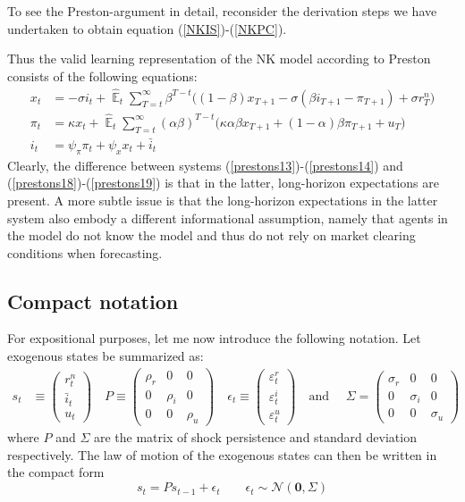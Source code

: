 \documentclass[11pt]{article}
\renewcommand{\[}{\begin{equation}}
\renewcommand{\]}{\end{equation}}
\DeclareMathOperator{\E}{\mathbb{E}}
\begin{document}
To see the Preston-argument in detail, reconsider the derivation steps we have undertaken to obtain equation (\ref{NKIS})-(\ref{NKPC}).

Thus the valid learning representation of the NK model according to Preston consists of the following equations:
\begin{align}
x_t &=  -\sigma i_t +\hat{\E}_t \sum_{T=t}^{\infty} \beta^{T-t }\big( (1-\beta)x_{T+1} - \sigma(\beta i_{T+1} - \pi_{T+1}) +\sigma r_T^n \big)  \label{prestons18}  \\
\pi_t &= \kappa x_t +\hat{\E}_t \sum_{T=t}^{\infty} (\alpha\beta)^{T-t }\big( \kappa \alpha \beta x_{T+1} + (1-\alpha)\beta \pi_{T+1} + u_T\big) \label{prestons19}  \\
i_t &= \psi_{\pi}\pi_t + \psi_{x} x_t + \bar{i}_t 
\end{align}
Clearly, the difference between systems (\ref{prestons13})-(\ref{prestons14}) and (\ref{prestons18})-(\ref{prestons19}) is that in the latter, long-horizon expectations are present. A more subtle issue is that the long-horizon expectations in the latter system also embody a different informational assumption, namely that agents in the model do not know the model and thus do not rely on market clearing conditions when forecasting.
  
 \subsection{Compact notation}
 For expositional purposes, let me now introduce the following notation. Let exogenous states be summarized as:
 \begin{align}
 s_t & \equiv \begin{pmatrix} r_t^n \\ \bar{i}_t \\ u_t 
 \end{pmatrix} \quad 
 P  \equiv \begin{pmatrix} \rho_r & 0 & 0 \\ 0& \rho_i & 0 \\ 0&0& \rho_u 
 \end{pmatrix}  \quad 
 \epsilon_t \equiv \begin{pmatrix}\varepsilon_t^{r} \\ \varepsilon_t^{i}  \\ \varepsilon_t^{u} 
 \end{pmatrix}  \quad  \text{and } \quad \Sigma  =  \begin{pmatrix} \sigma_r & 0 & 0 \\ 0& \sigma_i & 0 \\ 0&0& \sigma_u 
 \end{pmatrix} 
 \end{align}
 where $P$ and $\Sigma$ are the matrix of shock persistence and standard deviation respectively. The law of motion of the exogenous states can then be written in the compact form
 \begin{equation}
 s_t  = P s_{t-1} + \epsilon_t  \quad \quad \epsilon_t \sim \mathcal{N}(\mathbf{0}, \Sigma)
 \end{equation}
\end{document}

